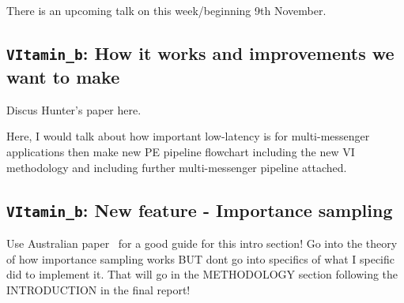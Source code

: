 \documentclass[11pt]{article}
\begin{document}
There is an upcoming talk on this week/beginning 9th November.

\subsection{\texttt{VItamin\_b}: How it works and improvements we want to make}

Discus Hunter's paper here.

Here, I would talk about how important low-latency is for multi-messenger applications then make new PE pipeline flowchart including the new VI methodology and including further multi-messenger pipeline attached.

\subsection{\texttt{VItamin\_b}: New feature \-- Importance sampling}

Use Australian paper~\cite{resample_aus} for a good guide for this intro section!
Go into the theory of how importance sampling works BUT dont go into specifics of what I specific did to implement it. That will go in the METHODOLOGY section following the INTRODUCTION in the final report!

\printbibliography[
heading=bibintoc,
title={References}
]
\end{document}
